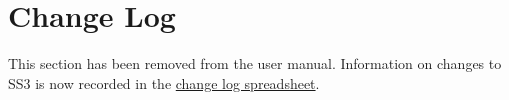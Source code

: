 
\section{Change Log}

This section has been removed from the user manual. Information on changes to SS3 is now recorded in the \href{https://github.com/nmfs-stock-synthesis/stock-synthesis/blob/main/Change_log_for_SS_3.30.xlsx}{change log spreadsheet}.

\pagebreak

